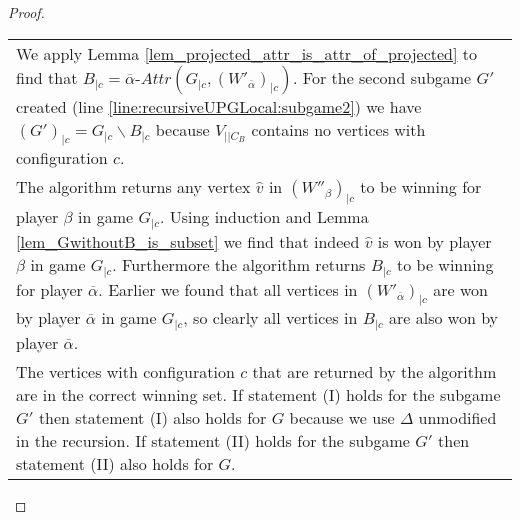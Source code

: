 \begin{theorem}
\begin{proof}
\begin{longtable}{|p{14.2cm}}
			\begin{tabular}{|p{13.6cm}}
				Assume $(W'_{\overline{\alpha}})_{|c} \neq \emptyset$\\
				\hline
				We apply Lemma \ref{lem_projected_attr_is_attr_of_projected} to find that $B_{|c} = \overline{\alpha}\textit{-Attr}(G_{|c},(W'_{\overline{\alpha}})_{|c})$. For the second subgame $G'$ created (line \ref{line:recursiveUPGLocal:subgame2}) we have $(G')_{|c} = G_{|c} \backslash B_{|c}$ because $V_{||C_B}$ contains no vertices with configuration $c$.\\
				The algorithm returns any vertex $\hat{v}$ in $(W''_\beta)_{|c}$ to be winning for player $\beta$ in game $G_{|c}$. Using induction and Lemma \ref{lem_GwithoutB_is_subset} we find that indeed $\hat{v}$ is won by player $\beta$ in game $G_{|c}$. Furthermore the algorithm returns $B_{|c}$ to be winning for player $\overline{\alpha}$. Earlier we found that all vertices in $(W'_{\overline{\alpha}})_{|c}$ are won by player $\overline{\alpha}$ in game $G_{|c}$, so clearly all vertices in $B_{|c}$ are also won by player $\overline{\alpha}$.\\
				The vertices with configuration $c$ that are returned by the algorithm are in the correct winning set. If statement (I) holds for the subgame $G'$ then statement (I) also holds for $G$ because we use $\Delta$ unmodified in the recursion. If statement (II) holds for the subgame $G'$ then statement (II) also holds for $G$.
			\end{tabular}
		\end{longtable}
	\end{proof}
\end{theorem}


